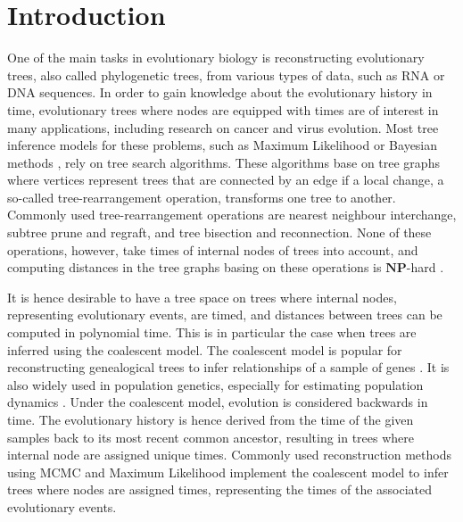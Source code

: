 \documentclass[11pt]{amsart}
\newcommand{\np}{\mathbf{NP}}
\newcommand{\summary}[1]{} %
\begin{document}
\section{Introduction}
\summary{Why we want a time-tree space}
One of the main tasks in evolutionary biology is reconstructing evolutionary trees, also called phylogenetic trees, from various types of data, such as RNA or DNA sequences.
In order to gain knowledge about the evolutionary history in time, evolutionary trees where nodes are equipped with times are of interest in many applications, including research on cancer and virus evolution.
Most tree inference models for these problems, such as Maximum Likelihood \autocite{Kozlov2019-cf, Nguyen2015-sp, Tamura2011-ky} or Bayesian methods \autocite{Bouckaert2014-ir,Suchard2018-tw, Ronquist2003-eq}, rely on tree search algorithms.
These algorithms base on tree graphs where vertices represent trees that are connected by an edge if a local change, a so-called tree-rearrangement operation, transforms one tree to another.
Commonly used tree-rearrangement operations are nearest neighbour interchange, subtree prune and regraft, and tree bisection and reconnection.
None of these operations, however, take times of internal nodes of trees into account, and computing distances in the tree graphs basing on these operations is $\np$-hard \autocite{Dasgupta2000-xa, Bordewich2005-nx, Allen2001-ky, Hickey2008-wv}.

\summary{Why discrete coalescent trees}
It is hence desirable to have a tree space on trees where internal nodes, representing evolutionary events, are timed, and distances between trees can be computed in polynomial time.
This is in particular the case when trees are inferred using the coalescent model.
The coalescent model is popular for reconstructing genealogical trees to infer relationships of a sample of genes \autocite{Hudson1990-ki, Kuhner2009-jb}.
It is also widely used in population genetics, especially for estimating population dynamics \autocite{Kuhner1998-eh,Drummond2005-ak}.
Under the coalescent model, evolution is considered backwards in time.
The evolutionary history is hence derived from the time of the given samples back to its most recent common ancestor, resulting in trees where internal node are assigned unique times.
Commonly used reconstruction methods using MCMC \autocite{Bouckaert2014-ir,Suchard2018-tw} and Maximum Likelihood \autocite{Kozlov2019-cf, Nguyen2015-sp} implement the coalescent model to infer trees where nodes are assigned times, representing the times of the associated evolutionary events.
\end{document}
